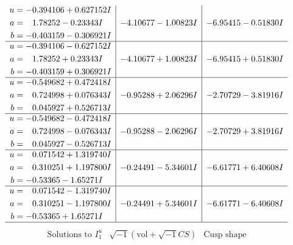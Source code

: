 \documentclass[1p]{elsarticle_modified}
\theoremstyle{definition}
\newcommand{\I}{\sqrt{-1}}
\begin{document}
$$\begin{array}{c|c|c}
\begin{aligned}
u &= -0.394106 + 0.627152 I \\
a &= \phantom{-}1.78252 - 0.23343 I \\
b &= -0.403159 - 0.306921 I\end{aligned}
 & -4.10677 - 1.00823 I & -6.95415 - 0.51830 I \\ \hline\begin{aligned}
u &= -0.394106 - 0.627152 I \\
a &= \phantom{-}1.78252 + 0.23343 I \\
b &= -0.403159 + 0.306921 I\end{aligned}
 & -4.10677 + 1.00823 I & -6.95415 + 0.51830 I \\ \hline\begin{aligned}
u &= -0.549682 + 0.472418 I \\
a &= \phantom{-}0.724998 + 0.076343 I \\
b &= \phantom{-}0.045927 + 0.526713 I\end{aligned}
 & -0.95288 + 2.06296 I & -2.70729 - 3.81916 I \\ \hline\begin{aligned}
u &= -0.549682 - 0.472418 I \\
a &= \phantom{-}0.724998 - 0.076343 I \\
b &= \phantom{-}0.045927 - 0.526713 I\end{aligned}
 & -0.95288 - 2.06296 I & -2.70729 + 3.81916 I \\ \hline\begin{aligned}
u &= \phantom{-}0.071542 + 1.319740 I \\
a &= \phantom{-}0.310251 + 1.197800 I \\
b &= -0.53365 - 1.65271 I\end{aligned}
 & -0.24491 - 5.34601 I & -6.61771 + 6.40608 I \\ \hline\begin{aligned}
u &= \phantom{-}0.071542 - 1.319740 I \\
a &= \phantom{-}0.310251 - 1.197800 I \\
b &= -0.53365 + 1.65271 I\end{aligned}
 & -0.24491 + 5.34601 I & -6.61771 - 6.40608 I\\
 \hline 
 \end{array}$$\newpage$$\begin{array}{c|c|c}  
\text{Solutions to }I^u_{1}& \I (\text{vol} + \sqrt{-1}CS) & \text{Cusp shape}\\
 \hline 
\begin{aligned}

\end{aligned}
\end{array}$$
\end{document}
